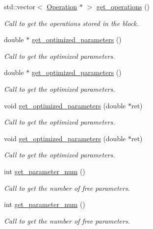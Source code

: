 \begin{DoxyCompactItemize}
std\+::vector$<$ \hyperlink{class_operation}{Operation} $\ast$ $>$ \hyperlink{class_operation__block_aecb9b674dfd43456605a6c13dfba3afb}{get\+\_\+operations} ()
\begin{DoxyCompactList}\small\item\em Call to get the operations stored in the block. \end{DoxyCompactList}\item 
double $\ast$ \hyperlink{class_decomposition___base_a27c8d07322621ccd644aaff8af667809}{get\+\_\+optimized\+\_\+parameters} ()
\begin{DoxyCompactList}\small\item\em Call to get the optimized parameters. \end{DoxyCompactList}\item 
double $\ast$ \hyperlink{class_decomposition___base_ae2dd23fc79127ca9d25eafeb1137d094}{get\+\_\+optimized\+\_\+parameters} ()
\begin{DoxyCompactList}\small\item\em Call to get the optimized parameters. \end{DoxyCompactList}\item 
void \hyperlink{class_decomposition___base_ae9d74e7137a05ceda5d6efeba8cc6c8e}{get\+\_\+optimized\+\_\+parameters} (double $\ast$ret)
\begin{DoxyCompactList}\small\item\em Call to get the optimized parameters. \end{DoxyCompactList}\item 
void \hyperlink{class_decomposition___base_ae9d74e7137a05ceda5d6efeba8cc6c8e}{get\+\_\+optimized\+\_\+parameters} (double $\ast$ret)
\begin{DoxyCompactList}\small\item\em Call to get the optimized parameters. \end{DoxyCompactList}\item 
int \hyperlink{class_operation__block_af7ff4a8876a7b1c062ea2f35efac18b0}{get\+\_\+parameter\+\_\+num} ()
\begin{DoxyCompactList}\small\item\em Call to get the number of free parameters. \end{DoxyCompactList}\item 
int \hyperlink{class_operation__block_af7ff4a8876a7b1c062ea2f35efac18b0}{get\+\_\+parameter\+\_\+num} ()
\begin{DoxyCompactList}\small\item\em Call to get the number of free parameters. \end{DoxyCompactList}\item 

\end{DoxyCompactItemize}

